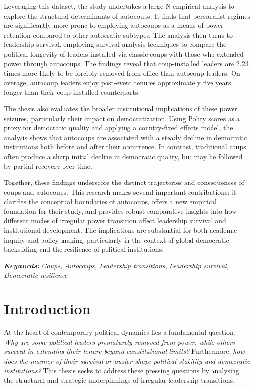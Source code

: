 \documentclass[
  12pt,
]{report}
\begin{document}
Leveraging this dataset, the study undertakes a large-N empirical
analysis to explore the structural determinants of autocoups. It finds
that personalist regimes are significantly more prone to employing
autocoups as a means of power retention compared to other autocratic
subtypes. The analysis then turns to leadership survival, employing
survival analysis techniques to compare the political longevity of
leaders installed via classic coups with those who extended power
through autocoups. The findings reveal that coup-installed leaders are
2.23 times more likely to be forcibly removed from office than autocoup
leaders. On average, autocoup leaders enjoy post-event tenures
approximately five years longer than their coup-installed counterparts.

The thesis also evaluates the broader institutional implications of
these power seizures, particularly their impact on democratization.
Using Polity scores as a proxy for democratic quality and applying a
country-fixed effects model, the analysis shows that autocoups are
associated with a steady decline in democratic institutions both before
and after their occurrence. In contrast, traditional coups often produce
a sharp initial decline in democratic quality, but may be followed by
partial recovery over time.

Together, these findings underscore the distinct trajectories and
consequences of coups and autocoups. This research makes several
important contributions: it clarifies the conceptual boundaries of
autocoups, offers a new empirical foundation for their study, and
provides robust comparative insights into how different modes of
irregular power transition affect leadership survival and institutional
development. The implications are substantial for both academic inquiry
and policy-making, particularly in the context of global democratic
backsliding and the resilience of political institutions.

\emph{\textbf{Keywords:} Coups, Autocoups, Leadership transitions,
Leadership survival, Democratic resilience}

\chapter{Introduction}\label{introduction}

At the heart of contemporary political dynamics lies a fundamental
question: \emph{Why are some political leaders prematurely removed from
power, while others succeed in extending their tenure beyond
constitutional limits?} Furthermore, \emph{how does the manner of their
survival or ouster shape political stability and democratic
institutions?} This thesis seeks to address these pressing questions by
analysing the structural and strategic underpinnings of irregular
leadership transitions.
\end{document}
